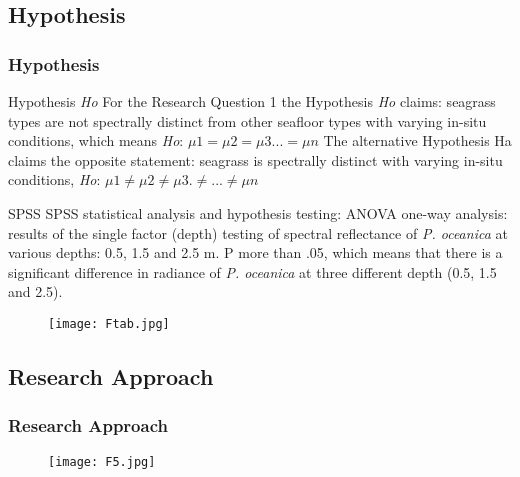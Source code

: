 \documentclass[pdflatex,compress,9pt,
	xcolor={dvipsnames,dvipsnames,svgnames,x11names,table},
	hyperref={colorlinks = true,breaklinks = true, urlcolor = NavyBlue, breaklinks = true}]{beamer}
\begin{document}
\subsection{Hypothesis}
\begin{frame}\frametitle{Hypothesis}

\begin{alertblock}{Hypothesis \emph{Ho}}
For the Research Question 1 the Hypothesis \emph{Ho} claims: seagrass types are not spectrally distinct from other
seafloor types with varying in-situ conditions, which means \emph{Ho}: $\mu 1 = \mu 2 = \mu 3 ... = \mu n$
The alternative Hypothesis Ha claims the opposite statement: seagrass is spectrally distinct with varying
in-situ conditions, \emph{Ho}: $\mu 1 \neq \mu 2 \neq \mu 3 .\neq ... \neq \mu n$
\end{alertblock}

\begin{block}{SPSS}
\ac{SPSS} statistical analysis and hypothesis testing: \ac{ANOVA} one-way analysis: results of the single factor (depth) testing of spectral reflectance of \emph{P. oceanica} at various depths: 0.5, 1.5 and 2.5 m. P more than .05, which means that there is a significant difference in radiance of \emph{P. oceanica} at three different depth (0.5, 1.5 and 2.5).
\end{block}

\begin{figure}[H]
	\centering
		\texttt{[image: Ftab.jpg]}
\end{figure}
\end{frame}

\subsection{Research Approach}
\begin{frame}\frametitle{Research Approach}
\begin{figure}[H]
	\centering
		\texttt{[image: F5.jpg]}
\end{figure}
\end{frame}
\end{document}

